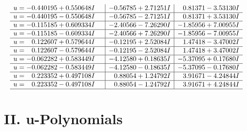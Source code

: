 \documentclass[1p]{elsarticle_modified}
\theoremstyle{definition}
\begin{document}
$$\begin{array}{c|c|c}
\begin{aligned}
u &= -0.440195 + 0.550648 I\end{aligned}
 & -0.56785 + 2.71251 I & \phantom{-}0.81371 - 3.53130 I \\ \hline\begin{aligned}
u &= -0.440195 - 0.550648 I\end{aligned}
 & -0.56785 - 2.71251 I & \phantom{-}0.81371 + 3.53130 I \\ \hline\begin{aligned}
u &= -0.115185 + 0.609334 I\end{aligned}
 & -2.40566 - 7.26290 I & -1.85956 + 7.00955 I \\ \hline\begin{aligned}
u &= -0.115185 - 0.609334 I\end{aligned}
 & -2.40566 + 7.26290 I & -1.85956 - 7.00955 I \\ \hline\begin{aligned}
u &= \phantom{-}0.122607 + 0.579644 I\end{aligned}
 & -0.12195 + 2.52084 I & \phantom{-}1.47418 - 3.47002 I \\ \hline\begin{aligned}
u &= \phantom{-}0.122607 - 0.579644 I\end{aligned}
 & -0.12195 - 2.52084 I & \phantom{-}1.47418 + 3.47002 I \\ \hline\begin{aligned}
u &= -0.062282 + 0.583449 I\end{aligned}
 & -4.12580 + 0.18635 I & -5.37095 + 0.17680 I \\ \hline\begin{aligned}
u &= -0.062282 - 0.583449 I\end{aligned}
 & -4.12580 - 0.18635 I & -5.37095 - 0.17680 I \\ \hline\begin{aligned}
u &= \phantom{-}0.223352 + 0.497108 I\end{aligned}
 & \phantom{-}0.88054 + 1.24792 I & \phantom{-}3.91671 - 4.24844 I \\ \hline\begin{aligned}
u &= \phantom{-}0.223352 - 0.497108 I\end{aligned}
 & \phantom{-}0.88054 - 1.24792 I & \phantom{-}3.91671 + 4.24844 I\\
 \hline 
 \end{array}$$\newpage
\newpage\renewcommand{\arraystretch}{1}
\centering \section*{ II. u-Polynomials}
\end{document}
